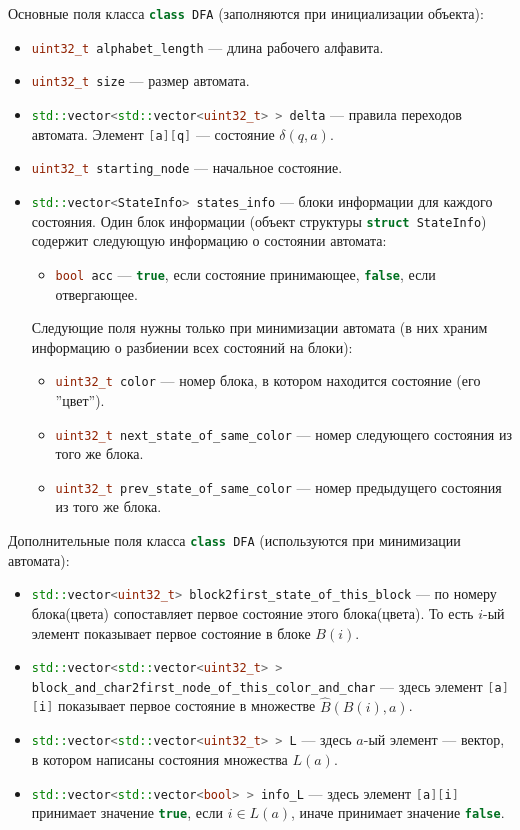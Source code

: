 \documentclass{article}
\begin{document}
Основные поля класса \lstinline[language=C++]!class DFA! (заполняются при инициализации объекта):
\begin{itemize}
  \item \lstinline[language=C++]!uint32_t alphabet_length! --- длина рабочего алфавита.
  \item \lstinline[language=C++]!uint32_t size! --- размер автомата.
  \item \lstinline[language=C++]!std::vector<std::vector<uint32_t> > delta! --- правила переходов автомата. Элемент \lstinline[language=C++]![a][q]! --- состояние $\delta(q, a)$.
  \item \lstinline[language=C++]!uint32_t starting_node! --- начальное состояние.
  \item \lstinline[language=C++]!std::vector<StateInfo> states_info! --- блоки информации для каждого состояния. Один блок информации (объект структуры \lstinline[language=C++]!struct StateInfo!) содержит следующую информацию о состоянии автомата:
  \begin{itemize}
    \item[\ding{118}] \lstinline[language=C++]!bool acc! --- \lstinline[language=C++]!true!, если состояние принимающее, \lstinline[language=C++]!false!, если отвергающее.
  \end{itemize}
  Следующие поля нужны только при минимизации автомата (в них храним информацию о разбиении  всех состояний на блоки):
  \begin{itemize}
    \item[\ding{118}] \lstinline[language=C++]!uint32_t color! --- номер блока, в котором находится состояние (его ''цвет'').
    \item[\ding{118}] \lstinline[language=C++]!uint32_t next_state_of_same_color! --- номер следующего состояния из того же блока.
    \item[\ding{118}] \lstinline[language=C++]!uint32_t prev_state_of_same_color! --- номер предыдущего состояния из того же блока.
  \end{itemize}
\end{itemize}
  Дополнительные поля класса \lstinline[language=C++]!class DFA! (используются при минимизации автомата):
\begin{itemize}
  \item \lstinline[language=C++]!std::vector<uint32_t> block2first_state_of_this_block! --- по номеру блока(цвета) сопоставляет первое состояние этого блока(цвета). То есть $i$-ый элемент показывает первое состояние в блоке $B(i)$.
  \item \lstinline[language=C++]!std::vector<std::vector<uint32_t> > block_and_char2first_node_of_this_color_and_char! --- здесь элемент \lstinline[language=C++]![a][i]! показывает первое состояние в множестве $\hat B(B(i), a)$.
  \item \lstinline[language=C++]!std::vector<std::vector<uint32_t> > L! --- здесь $a$-ый элемент --- вектор, в котором написаны состояния множества $L(a)$.
  \item \lstinline[language=C++]!std::vector<std::vector<bool> > info_L! --- здесь элемент \lstinline[language=C++]![a][i]! принимает значение \lstinline[language=C++]!true!, если $i \in L(a)$, иначе принимает значение \lstinline[language=C++]!false!.
\end{itemize}
\end{document}
